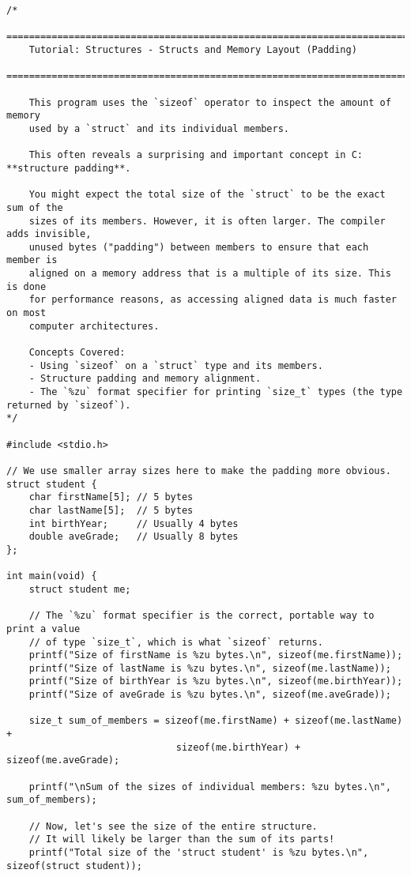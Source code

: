 \documentclass[11pt]{book}
\begin{document}
\begin{verbatim}
/*
    ================================================================================
    Tutorial: Structures - Structs and Memory Layout (Padding)
    ================================================================================

    This program uses the `sizeof` operator to inspect the amount of memory
    used by a `struct` and its individual members.

    This often reveals a surprising and important concept in C: **structure padding**.

    You might expect the total size of the `struct` to be the exact sum of the
    sizes of its members. However, it is often larger. The compiler adds invisible,
    unused bytes ("padding") between members to ensure that each member is
    aligned on a memory address that is a multiple of its size. This is done
    for performance reasons, as accessing aligned data is much faster on most
    computer architectures.

    Concepts Covered:
    - Using `sizeof` on a `struct` type and its members.
    - Structure padding and memory alignment.
    - The `%zu` format specifier for printing `size_t` types (the type returned by `sizeof`).
*/

#include <stdio.h>

// We use smaller array sizes here to make the padding more obvious.
struct student {
    char firstName[5]; // 5 bytes
    char lastName[5];  // 5 bytes
    int birthYear;     // Usually 4 bytes
    double aveGrade;   // Usually 8 bytes
};

int main(void) {
    struct student me;

    // The `%zu` format specifier is the correct, portable way to print a value
    // of type `size_t`, which is what `sizeof` returns.
    printf("Size of firstName is %zu bytes.\n", sizeof(me.firstName));
    printf("Size of lastName is %zu bytes.\n", sizeof(me.lastName));
    printf("Size of birthYear is %zu bytes.\n", sizeof(me.birthYear));
    printf("Size of aveGrade is %zu bytes.\n", sizeof(me.aveGrade));

    size_t sum_of_members = sizeof(me.firstName) + sizeof(me.lastName) +
                              sizeof(me.birthYear) + sizeof(me.aveGrade);

    printf("\nSum of the sizes of individual members: %zu bytes.\n", sum_of_members);

    // Now, let's see the size of the entire structure.
    // It will likely be larger than the sum of its parts!
    printf("Total size of the 'struct student' is %zu bytes.\n", sizeof(struct student));


\end{verbatim}
\end{document}
